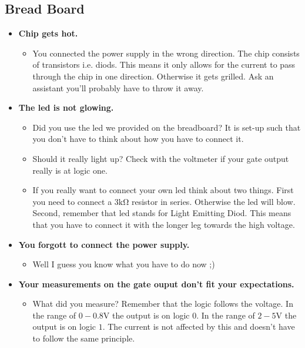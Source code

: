 \documentclass[10pt,a4paper]{article}
\begin{document}
\subsection{Bread Board}
\begin{itemize}
	\item \textbf{Chip gets hot.} 
	\begin{itemize}
		\item You connected the power supply in the wrong direction. The chip consists of transistors i.e. diods. This means it only allows for the current to pass through the chip in one direction. Otherwise it gets grilled. Ask an assistant you'll probably have to throw it away.
	\end{itemize}
	\item \textbf{The led is not glowing.}
	\begin{itemize}
		\item Did you use the led we provided on the breadboard? It is set-up such that you don't have to think about how you have to connect it.
		\item Should it really light up? Check with the voltmeter if your gate output really is at logic one.
		\item If you really want to connect your own led think about two things. First you need to connect a $3\si{\kilo\ohm}$ resistor in series. Otherwise the led will blow. Second, remember that led stands for Light Emitting Diod. This means that you have to connect it with the longer leg towards the high voltage. 
	\end{itemize}
	\item \textbf{You forgott to connect the power supply.}
	\begin{itemize}
		\item Well I guess you know what you have to do now ;)
	\end{itemize}
	\item \textbf{Your measurements on the gate ouput don't fit your expectations.}
	\begin{itemize}
		\item What did you measure? Remember that the logic follows the voltage. In the range of $0-0.8\si{\volt}$ the output is on logic $0$. In the range of $2-5\si{\volt}$ the output is on logic $1$. The current is not affected by this and doesn't have to follow the same principle.
	\end{itemize}
\end{itemize}
\end{document}
